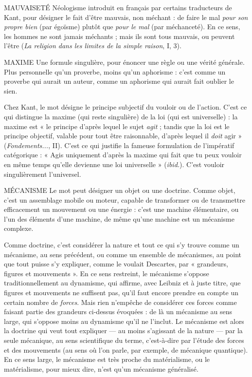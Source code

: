 MAUVAISETÉ Néologisme introduit en français par certains traducteurs
de Kant, pour désigner le fait d’être mauvais, non méchant :
de faire le mal {\it pour son propre bien} (par égoïsme) plutôt que {\it pour le mal} (par
méchanceté). En ce sens, les hommes ne sont jamais méchants ; mais ils sont tous
mauvais, ou peuvent l'être ({\it La religion dans les limites de la simple raison}, I, 3).

MAXIME Une formule singulière, pour énoncer une règle ou une vérité générale.
Plus personnelle qu’un proverbe, moins qu’un aphorisme :
c'est comme un proverbe qui aurait un auteur, comme un aphorisme qui aurait
fait oublier le sien.

Chez Kant, le mot désigne le principe subjectif du vouloir ou de l’action.
C'est ce qui distingue la maxime (qui reste singulière) de la loi (qui est
universelle) : la maxime est « le principe d’après lequel le sujet {\it agit} ; tandis que
la loi est le principe objectif, valable pour tout être raisonnable, d’après lequel
il {\it doit} agir » ({\it Fondements...}, II). C’est ce qui justifie la fameuse formulation de
l'impératif catégorique : « Agis uniquement d’après la maxime qui fait que tu
peux vouloir en même temps qu’elle devienne une loi universelle » ({\it ibid.}). C’est
vouloir singulièrement l’universel.

MÉCANISME Le mot peut désigner un objet ou une doctrine. Comme objet,
c'est un assemblage mobile ou moteur, capable de transformer
ou de transmettre efficacement un mouvement ou une énergie : c’est
une machine élémentaire, ou l’un des éléments d’une machine, de même
qu'une machine est un mécanisme complexe.

Comme doctrine, c’est considérer la nature et tout ce qui s’y trouve comme
un mécanisme, au sens précédent, ou comme un ensemble de mécanismes, au
point que tout puisse s’y expliquer, comme le voulait Descartes, par « grandeurs,
figures et mouvements ». En ce sens restreint, le mécanisme s’oppose traditionnellement
au dynamisme, qui affirme, avec Leibniz et à juste titre, que
figures et mouvements ne suffisent pas, qu’il faut encore prendre en compte un
certain nombre de {\it forces}. Mais rien n’empêche de considérer ces forces comme
faisant partie des grandeurs ci-dessus évoquées : de là un mécanisme au sens
large, qui s'oppose moins au dynamisme qu’il ne l’inclut. Le mécanisme est
alors la doctrine qui veut tout expliquer — au moins s’agissant de la nature — par
la seule mécanique, au sens scientifique du terme, c’est-à-dire par l’étude des
forces et des mouvements (au sens où l’on parle, par exemple, de mécanique
quantique). En ce sens large, le mécanisme est très proche du matérialisme, ou
le matérialisme, pour mieux dire, n’est qu’un mécanisme généralisé.

